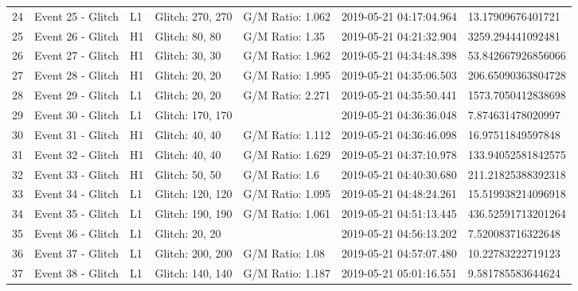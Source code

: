 \begin{longtable}{lllllll}
24 &                                  Event 25 - Glitch &       L1 &  Glitch: 270, 270 &  G/M Ratio: 1.062 &  2019-05-21 04:17:04.964 &  13.17909676401721 \\
25 &                                  Event 26 - Glitch &       H1 &    Glitch: 80, 80 &   G/M Ratio: 1.35 &  2019-05-21 04:21:32.904 & 3259.294441092481 \\
26 &                                  Event 27 - Glitch &       H1 &    Glitch: 30, 30 &  G/M Ratio: 1.962 &  2019-05-21 04:34:48.398 &   53.842667926856066 \\
27 &                                  Event 28 - Glitch &       H1 &    Glitch: 20, 20 &  G/M Ratio: 1.995 &  2019-05-21 04:35:06.503 &  206.65090363804728 \\
28 &                                  Event 29 - Glitch &       L1 &    Glitch: 20, 20 &  G/M Ratio: 2.271 &  2019-05-21 04:35:50.441 & 1573.7050412838698 \\
29 &                                  Event 30 - Glitch &       L1 &  Glitch: 170, 170 &                   &  2019-05-21 04:36:36.048 &    7.874631478020997 \\
30 &                                  Event 31 - Glitch &       H1 &    Glitch: 40, 40 &  G/M Ratio: 1.112 &  2019-05-21 04:36:46.098 &   16.97511849597848 \\
31 &                                  Event 32 - Glitch &       H1 &    Glitch: 40, 40 &  G/M Ratio: 1.629 &  2019-05-21 04:37:10.978 &  133.94052581842575 \\
32 &                                  Event 33 - Glitch &       H1 &    Glitch: 50, 50 &    G/M Ratio: 1.6 &  2019-05-21 04:40:30.680 &  211.21825388392318 \\
33 &                                  Event 34 - Glitch &       L1 &  Glitch: 120, 120 &  G/M Ratio: 1.095 &  2019-05-21 04:48:24.261 &   15.519938214096918 \\
34 &                                  Event 35 - Glitch &       L1 &  Glitch: 190, 190 &  G/M Ratio: 1.061 &  2019-05-21 04:51:13.445 &  436.52591713201264 \\
35 &                                  Event 36 - Glitch &       L1 &    Glitch: 20, 20 &                   &  2019-05-21 04:56:13.202 &    7.520083716322648 \\
36 &                                  Event 37 - Glitch &       L1 &  Glitch: 200, 200 &   G/M Ratio: 1.08 &  2019-05-21 04:57:07.480 &   10.22783222719123 \\
37 &                                  Event 38 - Glitch &       L1 &  Glitch: 140, 140 &  G/M Ratio: 1.187 &  2019-05-21 05:01:16.551 &    9.581785583644624 \\

\end{longtable}

